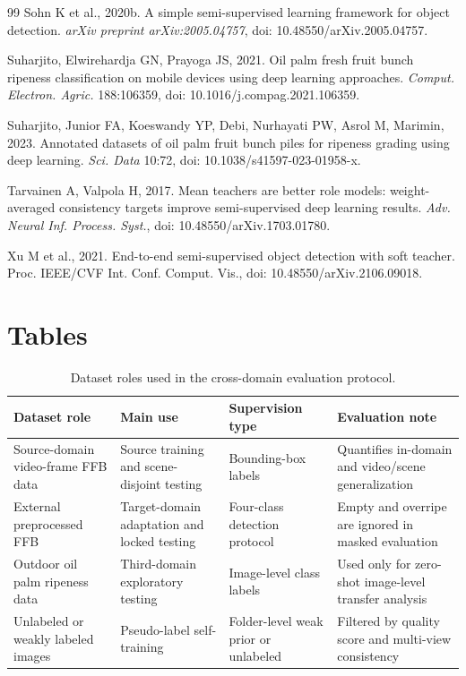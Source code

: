 ﻿\documentclass[12pt]{article}
\begin{document}
\begin{thebibliography}{99}
Sohn K et al., 2020b. A simple semi-supervised learning framework for object detection. \textit{arXiv preprint arXiv:2005.04757}, doi: 10.48550/arXiv.2005.04757.

Suharjito, Elwirehardja GN, Prayoga JS, 2021. Oil palm fresh fruit bunch ripeness classification on mobile devices using deep learning approaches. \textit{Comput. Electron. Agric.} 188:106359, doi: 10.1016/j.compag.2021.106359.

Suharjito, Junior FA, Koeswandy YP, Debi, Nurhayati PW, Asrol M, Marimin, 2023. Annotated datasets of oil palm fruit bunch piles for ripeness grading using deep learning. \textit{Sci. Data} 10:72, doi: 10.1038/s41597-023-01958-x.

Tarvainen A, Valpola H, 2017. Mean teachers are better role models: weight-averaged consistency targets improve semi-supervised deep learning results. \textit{Adv. Neural Inf. Process. Syst.}, doi: 10.48550/arXiv.1703.01780.

Xu M et al., 2021. End-to-end semi-supervised object detection with soft teacher. Proc. IEEE/CVF Int. Conf. Comput. Vis., doi: 10.48550/arXiv.2106.09018.

\end{thebibliography}

\clearpage
\section*{Tables}

\begin{table}[h]
\centering
\caption{Dataset roles used in the cross-domain evaluation protocol.}
\label{tab:dataset_roles}
\small
\setlength{\tabcolsep}{3pt}
\begin{tabular}{@{}>{\raggedright\arraybackslash}p{}>{\raggedright\arraybackslash}p{}>{\raggedright\arraybackslash}p{}>{\raggedright\arraybackslash}p{}@{}}
\toprule
Dataset role & Main use & Supervision type & Evaluation note \\
\midrule
Source-domain video-frame FFB data & Source training and scene-disjoint testing & Bounding-box labels & Quantifies in-domain and video/scene generalization \\
External preprocessed FFB & Target-domain adaptation and locked testing & Four-class detection protocol & Empty and overripe are ignored in masked evaluation \\
Outdoor oil palm ripeness data & Third-domain exploratory testing & Image-level class labels & Used only for zero-shot image-level transfer analysis \\
Unlabeled or weakly labeled images & Pseudo-label self-training & Folder-level weak prior or unlabeled & Filtered by quality score and multi-view consistency \\
\bottomrule
\end{tabular}
\end{table}
\end{document}
